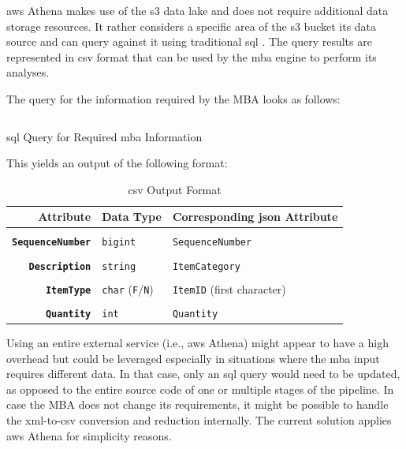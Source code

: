 \ac{aws} Athena makes use of the \ac{s3} data lake and does not require additional data storage resources. It rather considers a specific area of the \ac{s3} bucket its data source and can query against it using traditional \ac{sql} \cite{athena}. The query results are represented in \ac{csv} format that can be used by the \ac{mba} engine to perform its analyses.

The query for the information required by the MBA looks as follows:

\begin{listing}[H]
	\inputminted{sql}{main-matter/src/3-athena-query.sql}
	\caption{\acs{sql} Query for Required \acs{mba} Information}
	\label{src:3-athena-query}
\end{listing}

This yields an output of the following format:
\begin{table}[h!]
	\centering
	\begin{tabular}{r|ll}
		\textbf{Attribute}      & \textbf{Data Type}  & \textbf{Corresponding \acs{json} Attribute}  \\ \hline \\[-1em]
		\textbf{\texttt{SequenceNumber}} & \texttt{bigint}     & \texttt{SequenceNumber}               \\ \\[-1em]
		\textbf{\texttt{Description}}    & \texttt{string}     & \texttt{ItemCategory}                 \\ \\[-1em]
		\textbf{\texttt{ItemType}}       & \texttt{char} (\texttt{F}/\texttt{N}) & \texttt{ItemID} (first character)     \\ \\[-1em]
		\textbf{\texttt{Quantity}}       & \texttt{int}        & \texttt{Quantity}                    
	\end{tabular}
	\caption{\acs{csv} Output Format}
	\label{tab:3-csv-format}
\end{table}

Using an entire external service (i.e., \ac{aws} Athena) might appear to have a high overhead but could be leveraged especially in situations where the \ac{mba} input requires different data. In that case, only an \ac{sql} query would need to be updated, as opposed to the entire source code of one or multiple stages of the pipeline. In case the MBA does not change its requirements, it might be possible to handle the \ac{xml}-to-\ac{csv} conversion and reduction internally. The current solution applies \ac{aws} Athena for simplicity reasons.

